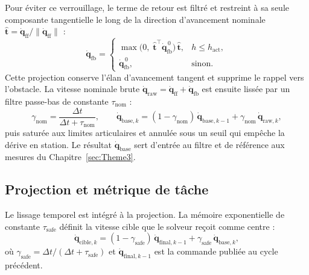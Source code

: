 Pour éviter ce verrouillage, le terme de retour est filtré et restreint à sa seule composante tangentielle le long de la direction d'avancement nominale $\hat{\mathbf{t}} = \dot{\mathbf{q}}_{\mathrm{ff}}/\|\dot{\mathbf{q}}_{\mathrm{ff}}\|$ :
\begin{equation}
\dot{\mathbf{q}}_{\mathrm{fb}} =
\begin{cases}
\max\!\big(0,\; \hat{\mathbf{t}}^\top\dot{\mathbf{q}}_{\mathrm{fb}}^{\,0}\big)\,\hat{\mathbf{t}}, & h \leq h_{\mathrm{act}},\\[4pt]
\dot{\mathbf{q}}_{\mathrm{fb}}^{\,0}, & \text{sinon}.
\end{cases}
\end{equation}
Cette projection conserve l'élan d'avancement tangent et supprime le rappel vers l'obstacle.
La vitesse nominale brute $\dot{\mathbf{q}}_{\mathrm{raw}} = \dot{\mathbf{q}}_{\mathrm{ff}} + \dot{\mathbf{q}}_{\mathrm{fb}}$ est ensuite lissée par un filtre passe-bas de constante $\tau_{\mathrm{nom}}$ :
\begin{equation}
\gamma_{\mathrm{nom}} = \frac{\Delta t}{\Delta t+\tau_{\mathrm{nom}}},
\qquad
\dot{\mathbf{q}}_{\mathrm{base},k} = (1-\gamma_{\mathrm{nom}})\, \dot{\mathbf{q}}_{\mathrm{base},k-1} + \gamma_{\mathrm{nom}}\, \dot{\mathbf{q}}_{\mathrm{raw},k},
\end{equation}
puis saturée aux limites articulaires et annulée sous un seuil qui empêche la dérive en station. Le résultat $\dot{\mathbf{q}}_{\mathrm{base}}$ sert d'entrée au filtre et de référence aux mesures du Chapitre~\ref{sec:Theme3}.

\subsection{Projection et métrique de tâche}\label{subsec:projection}

  Le lissage temporel est intégré à la projection. La mémoire exponentielle de constante $\tau_{\mathrm{safe}}$ définit la vitesse cible que le solveur reçoit comme centre :
  \begin{equation}\label{eq:vitesse_cible}
  \dot{\mathbf{q}}_{\mathrm{cible},k} = (1-\gamma_{\mathrm{safe}})\,\dot{\mathbf{q}}_{\mathrm{final},k-1} + \gamma_{\mathrm{safe}}\,\dot{\mathbf{q}}_{\mathrm{base},k},
  \end{equation}
  où $\gamma_{\mathrm{safe}} = \Delta t/(\Delta t+\tau_{\mathrm{safe}})$ et $\dot{\mathbf{q}}_{\mathrm{final},k-1}$ est la commande publiée au cycle précédent.

